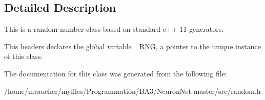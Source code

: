 \subsection{Detailed Description}
This is a random number class based on standard c++-\/11 generators.

This headers declares the global variable \+\_\+\+R\+NG, a pointer to the unique instance of this class. 

The documentation for this class was generated from the following file\+:\begin{DoxyCompactItemize}
\item 
/home/mvaucher/myfiles/\+Programmation/\+B\+A3/\+Neuron\+Net-\/master/src/random.\+h\end{DoxyCompactItemize}
